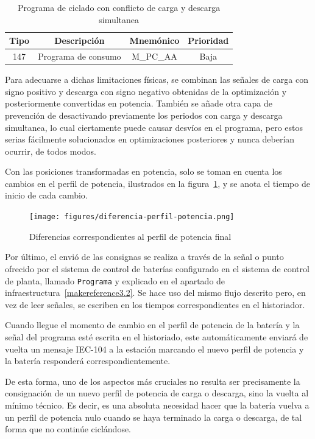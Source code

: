 \begin{table}[ht]
\centering
\begin{tabular}{|c|c|c|c|}
\hline
Tipo & Descripción         & Mnemónico & Prioridad \\
\hline
147  & Programa de consumo & M\_PC\_AA & Baja      \\
\hline
\end{tabular}
\caption{Programa de ciclado con conflicto de carga y descarga simultanea}
\label{tab:carga-descarga-simultanea}
\end{table}

Para adecuarse a dichas limitaciones físicas, se combinan las señales de carga con signo positivo y descarga con signo negativo obtenidas de la optimización y posteriormente convertidas en potencia. También se añade otra capa de prevención de desactivando previamente los periodos con carga y descarga simultanea, lo cual ciertamente puede causar desvíos en el programa, pero estos serias fácilmente solucionados en optimizaciones posteriores y nunca deberían ocurrir, de todos modos.

Con las posiciones transformadas en potencia, solo se toman en cuenta los cambios en el perfil de potencia, ilustrados en la figura~\ref{fig:diferencia-perfil-potencia}, y se anota el tiempo de inicio de cada cambio.

\begin{figure}
\centering
\texttt{[image: figures/diferencia-perfil-potencia.png]}
\caption{Diferencias correspondientes al perfil de potencia final}
\label{fig:diferencia-perfil-potencia}
\end{figure}

Por último, el envió de las consignas se realiza a través de la señal o punto ofrecido por el sistema de control de baterías configurado en el sistema de control de planta, llamado \texttt{Programa} y explicado en el apartado de infraestructura~\ref{makereference3.2}. Se hace uso del mismo flujo descrito pero, en vez de leer señales, se escriben en los tiempos correspondientes en el historiador.

Cuando llegue el momento de cambio en el perfil de potencia de la batería y la señal del programa esté escrita en el historiado, este automáticamente enviará de vuelta un mensaje IEC-104 a la estación marcando el nuevo perfil de potencia y la batería responderá correspondientemente.

De esta forma, uno de los aspectos más cruciales no resulta ser precisamente la consignación de un nuevo perfil de potencia de carga o descarga, sino la vuelta al mínimo técnico. Es decir, es una absoluta necesidad hacer que la batería vuelva a un perfil de potencia nulo cuando se haya terminado la carga o descarga, de tal forma que no continúe ciclándose.

